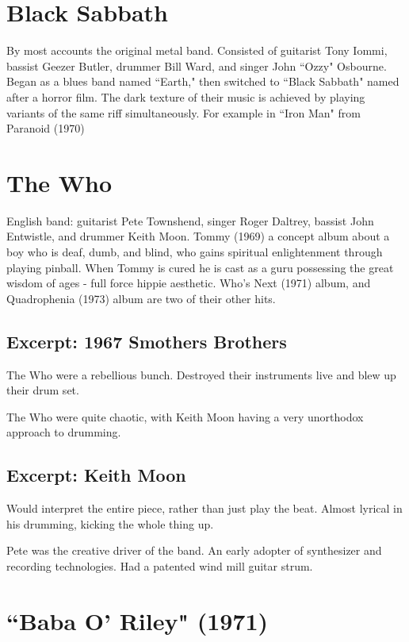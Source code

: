 \documentclass[12pt, a4paper, twoside, openright, titlepage]{book}
\begin{document}
\section{Black Sabbath}

By most accounts the original metal band. Consisted of guitarist Tony Iommi, bassist Geezer Butler, drummer Bill Ward, and singer John ``Ozzy" Osbourne. Began as a blues band named ``Earth," then switched to ``Black Sabbath" named after a horror film. The dark texture of their music is achieved by playing variants of the same riff simultaneously. For example in ``Iron Man" from Paranoid (1970)


\section{The Who}

English band: guitarist Pete Townshend, singer Roger Daltrey, bassist John Entwistle, and drummer Keith Moon. Tommy (1969) a concept album about a boy who is deaf, dumb, and blind, who gains spiritual enlightenment through playing pinball. When Tommy is cured he is cast as a guru possessing the great wisdom of ages - full force hippie aesthetic. Who's Next (1971) album, and Quadrophenia (1973) album are two of their other hits.

\subsection{Excerpt: 1967 Smothers Brothers}

The Who were a rebellious bunch. Destroyed their instruments live and blew up their drum set.

The Who were quite chaotic, with Keith Moon having a very unorthodox approach to drumming.

\subsection{Excerpt: Keith Moon}

Would interpret the entire piece, rather than just play the beat. Almost lyrical in his drumming, kicking the whole thing up.


Pete was the creative driver of the band. An early adopter of synthesizer and recording technologies. Had a patented wind mill guitar strum.

\section{``Baba O' Riley" (1971)}
\end{document}
